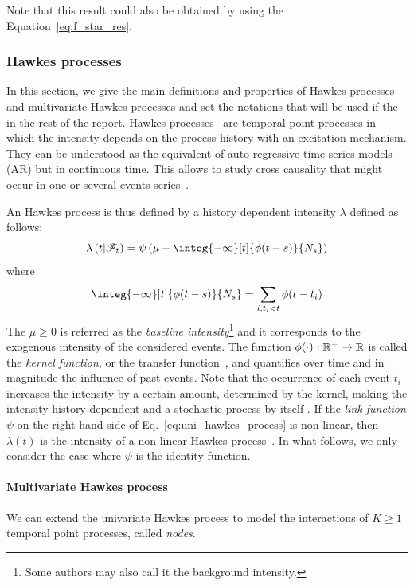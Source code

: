 Note that this result could also be obtained by using the Equation~\eqref{eq:f_star_res}.

\subsubsection{Hawkes processes}\label{hawkes_processes}

In this section, we give the main definitions and properties of Hawkes processes and multivariate Hawkes processes and set the notations that will be used if the in the rest of the report.
Hawkes processes~\citep{hawkes1971point, hawkes1974cluster} are temporal point processes in which the intensity depends on the process history with an excitation mechanism.
They can be understood as the equivalent of auto-regressive time series models (AR) but in continuous time.
This allows to study cross causality that might occur in one or several events series~\citep{bompaire2019machine}.

An Hawkes process is thus defined by a history dependent intensity $\lambda$ defined as follows:
\begin{equation}\label{eq:uni_hawkes_process}
    \lambda\pars{t\middle| \mathscr{F}_t} = \psi\pars{\mu + \integ{-\infty}[t]{\phi(t-s)}{N_s}}
\end{equation}
where 
\begin{equation}
    \integ{-\infty}[t]{\phi(t-s)}{N_s} = \sum_{i, t_i<t} \phi(t-t_i)
\end{equation}
The $\mu \geq 0$ is referred as the \textit{baseline intensity}\footnote{Some authors may also call it the background intensity.} and it corresponds to the exogenous intensity of the considered events.
The function $\phi(\cdot):\mathbb{R}^+\to\mathbb{R}$ is called the \textit{kernel function}, or the transfer function~\citep{chen2017multivariate}, and quantifies over time and in magnitude the influence of past events.
Note that the occurrence of each event $t_i$ increases the intensity by a certain amount, determined by the kernel, making the intensity history dependent and a stochastic process by itself \citep{de2019temporal}.
If the \textit{link function} $\psi$ on the right-hand side of Eq.~\ref{eq:uni_hawkes_process} is non-linear, then $\lambda(t)$ is the intensity of a non-linear Hawkes process~\citep{bremaud1996stability}.
In what follows, we only consider the case where $\psi$ is the identity function.

\paragraph{Multivariate Hawkes process} We can extend the univariate Hawkes process to model the interactions of $K\geq 1$ temporal point processes, called \textit{nodes}.

